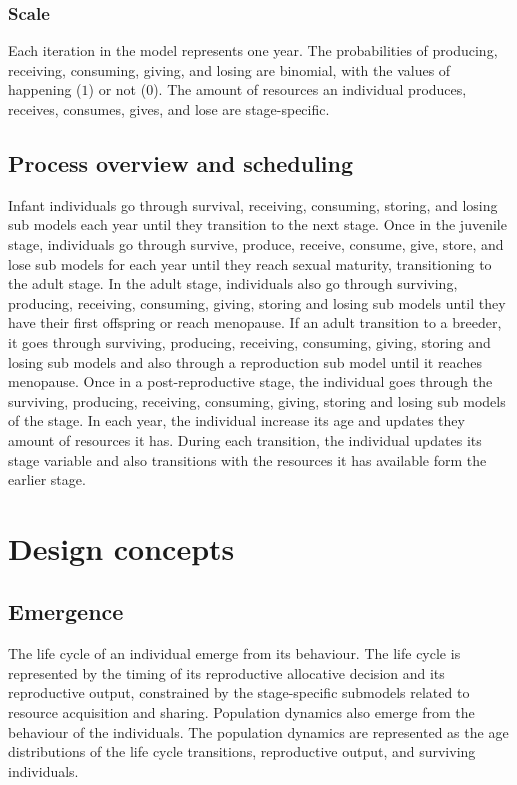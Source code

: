 \documentclass{article}
\begin{document}
\subsubsection{Scale}

Each iteration in the model represents one year. The probabilities  of producing, receiving, consuming, giving, and losing are binomial, with the values of happening ($1$) or not ($0$). The amount of resources an individual produces, receives, consumes, gives, and lose are stage-specific.

\subsection{Process overview and scheduling}

Infant individuals go through survival, receiving, consuming, storing, and losing sub models each year until they transition to the next stage. Once in the juvenile stage, individuals go through survive, produce, receive, consume, give, store, and lose sub models for each year until they reach sexual maturity, transitioning to the adult stage. In the adult stage, individuals also go through surviving, producing, receiving, consuming, giving, storing and losing sub models until they have their first offspring or reach menopause. If an adult transition to a breeder, it goes through surviving, producing, receiving, consuming, giving, storing and losing sub models and also through a reproduction sub model until it reaches menopause. Once in a post-reproductive stage, the individual goes through the surviving, producing, receiving, consuming, giving, storing and losing sub models of the stage. In each year, the individual increase its age and updates they amount of resources it has. During each transition, the individual updates its stage variable and also transitions with the resources it has available form the earlier stage.

\section{Design concepts}

\subsection{Emergence}

 The life cycle of an individual emerge from its behaviour. The life cycle is represented by the timing of its reproductive allocative decision and its reproductive output, constrained by the stage-specific submodels related to resource acquisition and sharing. Population dynamics also emerge from the behaviour of the individuals. The population dynamics are represented as the age distributions of the life cycle transitions, reproductive output, and surviving individuals. 
\end{document}
